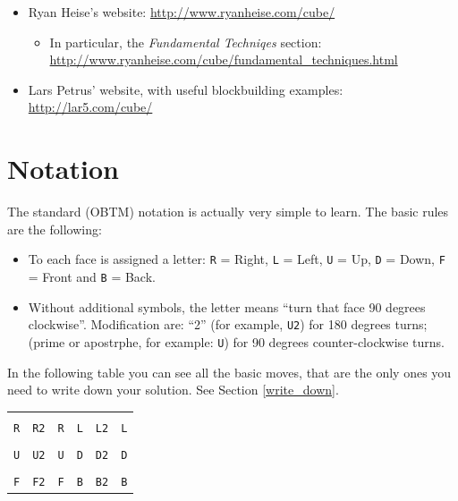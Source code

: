 \documentclass[11pt,a4paper]{book}
\newcommand{\p}{\textquotesingle}
\newcommand{\m}{\texttt}
\begin{document}
\begin{itemize}
\item Ryan Heise's website: \url{http://www.ryanheise.com/cube/}
\begin{itemize}
\item In particular, the \emph{Fundamental Techniqes} section: \url{http://www.ryanheise.com/cube/fundamental_techniques.html}
\end{itemize}
\item Lars Petrus' website, with useful blockbuilding examples: \url{http://lar5.com/cube/}
\end{itemize}

\chapter{Notation}
\label{notation}

The standard (OBTM) notation is actually very simple to learn. The basic rules are the following:

\begin{itemize}
\item To each face is assigned a letter: \m R = Right, \m L = Left, \m U = Up, \m D = Down, \m F = Front and \m B = Back.
\item Without additional symbols, the letter means ``turn that face 90 degrees clockwise''. Modification are: ``2'' (for example, \m{U2}) for 180 degrees turns; \p (prime or apostrphe, for example: \m{U\p}) for 90 degrees counter-clockwise turns.
\end{itemize}

In the following table you can see all the basic moves, that are the only ones you need to write down your solution. See Section \ref{write_down}.

\begin{center}
\begin{tabular}{|c|c|c|c|c|c|}
\hline
 &  &  &  &  &  \\
\m R & \m{R2} & \m{R\p} & \m L & \m{L2} & \m{L\p}\\
\hline
 &  &  &  &  &  \\
\m U & \m{U2} & \m{U\p} & \m D & \m{D2} & \m{D\p}\\
\hline
 &  &  &  &  &  \\
\m F & \m{F2} & \m{F\p} & \m B & \m{B2} & \m{B\p}\\
\hline
\end{tabular}
\end{center}
\end{document}
